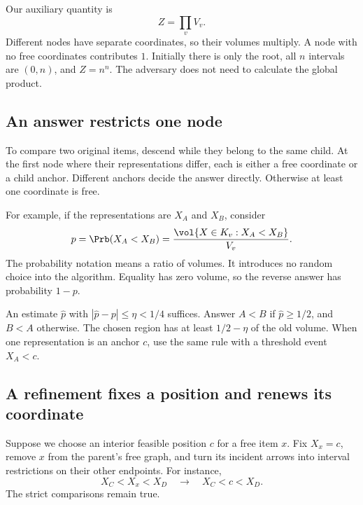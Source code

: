 Our auxiliary quantity is
\begin{equation}\label{eq:Z}
Z=\prod_v V_v.
\end{equation}
Different nodes have separate coordinates, so their volumes multiply. A node with no free coordinates contributes \(1\). Initially there is only the root, all \(n\) intervals are \((0,n)\), and \(Z=n^n\). The adversary does not need to calculate the global product.

\subsection{An answer restricts one node}

To compare two original items, descend while they belong to the same child. At the first node where their representations differ, each is either a free coordinate or a child anchor. Different anchors decide the answer directly. Otherwise at least one coordinate is free.

For example, if the representations are \(X_A\) and \(X_B\), consider
\[
p=\Prb(X_A<X_B)=
\frac{\vol\{X\in K_v:X_A<X_B\}}{V_v}.
\]
The probability notation means a ratio of volumes. It introduces no random choice into the algorithm. Equality has zero volume, so the reverse answer has probability \(1-p\).

An estimate \(\widehat p\) with \(|\widehat p-p|\le\eta<1/4\) suffices. Answer \(A<B\) if \(\widehat p\ge1/2\), and \(B<A\) otherwise. The chosen region has at least \(1/2-\eta\) of the old volume. When one representation is an anchor \(c\), use the same rule with a threshold event \(X_A<c\).


\subsection{A refinement fixes a position and renews its coordinate}

Suppose we choose an interior feasible position \(c\) for a free item \(x\). Fix \(X_x=c\), remove \(x\) from the parent's free graph, and turn its incident arrows into interval restrictions on their other endpoints. For instance,
\[
X_C<X_x<X_D
\quad\longrightarrow\quad
X_C<c<X_D.
\]
The strict comparisons remain true.


